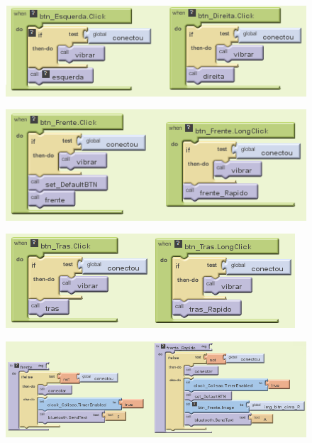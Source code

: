 \documentclass[portugues, brazil, a4paper,12pt]{article}
\begin{document}
\begin{figure}[H]
	\centering
	\includegraphics[scale=.8]{img/controle/fdireitaesquerda.png}
	
\end{figure}


\begin{figure}[H]
	\centering
	\includegraphics[scale=.8]{img/controle/ffrentes.png}
	
\end{figure}


\begin{figure}[H]
	\centering
	\includegraphics[scale=.8]{img/controle/ftras.png}
	
\end{figure}

\begin{figure}[H]
	\centering
	\includegraphics[scale=.8]{img/controle/frentes.png}
	
\end{figure}
\end{document}
